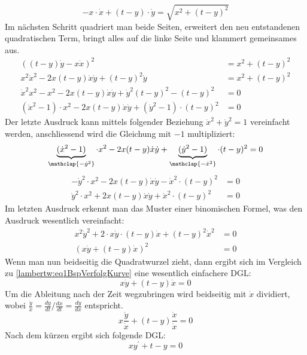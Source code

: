 \begin{equation}
		-x \cdot \dot{x} + (t-y) \cdot \dot{y}
		= \sqrt{x^2 + (t-y)^2}
		\label{lambertw:eq1BspVerfolgKurve}
\end{equation}
Im nächsten Schritt quadriert man beide Seiten, erweitert den neu entstandenen quadratischen Term, bringt alles auf die linke Seite und klammert gemeinsames aus.
\begin{align*}
	((t-y) \dot{y} - x \dot{x})^2
	&= x^2 + (t-y)^2 \\
	x^2 \dot{x}^2 - 2x(t-y) \dot{x} \dot{y} + (t-y)^2 \dot{y}
	&= x^2 + (t-y)^2 \\
	\dot{x}^2 x^2 - x^2 - 2x(t-y) \dot{x} \dot{y} + \dot{y}^2 (t-y)^2 - (t-y)^2
	&= 0 \\
	(\dot{x}^2 - 1) \cdot x^2 - 2x(t-y) \dot{x} \dot{y} + (\dot{y}^2 - 1) \cdot (t-y)^2
	&= 0
\end{align*}
Der letzte Ausdruck kann mittels folgender Beziehung \(\dot{x}^2 + \dot{y}^2 = 1\) vereinfacht werden, anschliessend wird die Gleichung mit \(-1\) multipliziert:
\[
	\underbrace{(\dot{x}^2 - 1)}_{\mathclap{-\dot{y}^2}} \cdot x^2 - 2x(t-y) \dot{x} \dot{y} + \underbrace{(\dot{y}^2 - 1)}_{\mathclap{-\dot{x}^2}} \cdot (t-y)^2
	= 0
\]
\begin{align*}
	- \dot{y}^2 \cdot x^2 - 2x(t-y) \dot{x} \dot{y} - \dot{x}^2 \cdot (t-y)^2
	&= 0 \\
	\dot{y}^2 \cdot x^2 + 2x(t-y) \dot{x} \dot{y} + \dot{x}^2 \cdot (t-y)^2
	&= 0
\end{align*}
Im letzten Ausdruck erkennt man das Muster einer binomischen Formel, was den Ausdruck wesentlich vereinfacht:
\begin{align*}
	x^2 \dot{y}^2  + 2 \cdot x \dot{y} \cdot (t-y) \dot{x}  + (t-y)^2 \dot{x}^2
	&= 0 \\
	(x \dot{y} + (t-y) \dot{x})^2
	&= 0
\end{align*}
Wenn man nun beidseitig die Quadratwurzel zieht, dann ergibt sich im Vergleich zu \eqref{lambertw:eq1BspVerfolgKurve} eine wesentlich einfachere DGL:
\begin{equation}
	x \dot{y} + (t-y) \dot{x}
	= 0
	\label{lambertw:equation5}
\end{equation}
Um die Ableitung nach der Zeit wegzubringen wird beidseitig mit \(\dot{x}\) dividiert, wobei \(\frac{\dot{y}}{\dot{x}} = \frac{dy}{dt}/\frac{dx}{dt} = \frac{dy}{dx}\) entspricht.
\[
	x \frac{\dot{y}}{\dot{x}} + (t-y) \frac{\dot{x}}{\dot{x}}
	= 0
\]
Nach dem kürzen ergibt sich folgende DGL:
\begin{equation}
	x y^{\prime} + t - y
	= 0
	\label{lambertw:DGLmitT}
\end{equation}
